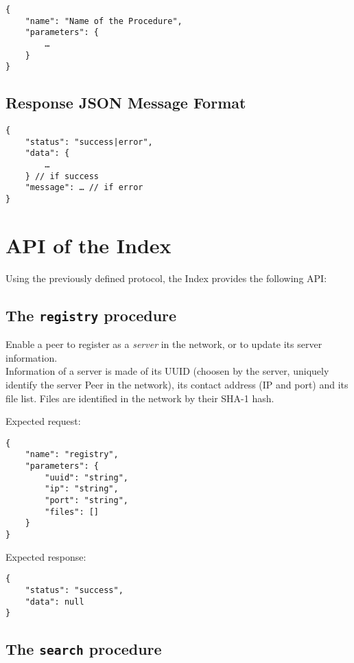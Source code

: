 \documentclass{article}
\begin{document}
\begin{Verbatim}[tabsize=4]
{
	"name": "Name of the Procedure",
	"parameters": {
		…
	}
}
\end{Verbatim}

\subsection{Response JSON Message Format}

\begin{Verbatim}[tabsize=4]
{
	"status": "success|error",
	"data": {
		…
	} // if success
	"message": … // if error
}
\end{Verbatim}

\section{API of the Index}

Using the previously defined protocol, the Index provides the following API:

\subsection{The \texorpdfstring{\protect\Verb+registry+}{registry} procedure}

Enable a peer to register as a \textit{server} in the network, or to update its server information. \\
Information of a server is made of its UUID (choosen by the server, uniquely identify the server Peer in the network), its contact address (IP and port) and its file list. Files are identified in the network by their SHA-1 hash.

\vspace{1.0\baselineskip}

\noindent Expected request:

\begin{Verbatim}[tabsize=4]
{
	"name": "registry",
	"parameters": {
		"uuid": "string",
		"ip": "string",
		"port": "string",
		"files": []
	}
}
\end{Verbatim}

\noindent Expected response:

\begin{Verbatim}[tabsize=4]
{
	"status": "success",
	"data": null
}
\end{Verbatim}

\subsection{The \texorpdfstring{\protect\Verb+search+}{search} procedure}
\end{document}

